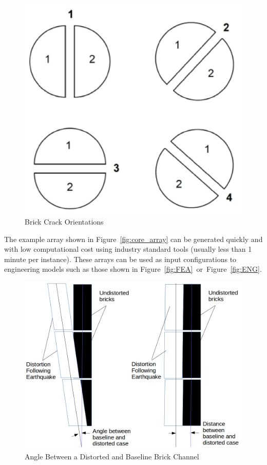 \begin{figure}[ht!]
	\centering
	\includegraphics[scale=0.1]{Figures/orientations}
	\caption{Brick Crack Orientations}
	\label{fig:orientations}
\end{figure}

\noindent
The example array shown in Figure~\ref{fig:core_array} can be generated quickly and with low computational cost using industry standard tools (usually less than 1 minute per instance). These arrays can be used as input configurations to engineering models such as those shown in Figure~\ref{fig:FEA}~or~Figure~\ref{fig:ENG}. \\

\begin{figure}[ht!]
	\centering
	\includegraphics[scale=0.2]{Figures/Distored_bricks}
	\caption{Angle Between a Distorted and Baseline Brick Channel }
	\label{fig:angles}
\end{figure}

